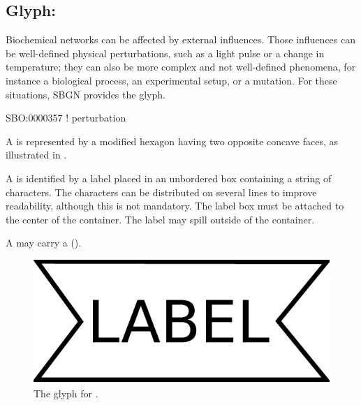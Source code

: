 
\subsection{Glyph: }
\label{sec:perturbation}
 
Biochemical networks can be affected by external influences.  Those
influences can be well-defined physical perturbations, such as a light
pulse or a change in temperature; they can also be more complex and not
well-defined phenomena, for instance a biological process, an experimental
setup, or a mutation.  For these situations, SBGN provides the
 glyph.

\begin{glyphDescription}

\glyphSboTerm SBO:0000357 ! perturbation

\glyphContainer A  is represented by a modified hexagon
having two opposite concave faces, as illustrated in .

\glyphLabel A  is identified by a label placed in an
unbordered box containing a string of characters.  The characters can be
distributed on several lines to improve readability, although this is not
mandatory.  The label box must be attached to the center of the
 container.  The label may spill outside of the container.

\glyphAux A  may carry a 
().

\end{glyphDescription}

\begin{figure}[H]
  \centering
  \includegraphics[scale = 0.3]{images/perturbation}
  \caption{The \PD glyph for .}
  \label{fig:perturbation}
\end{figure}





